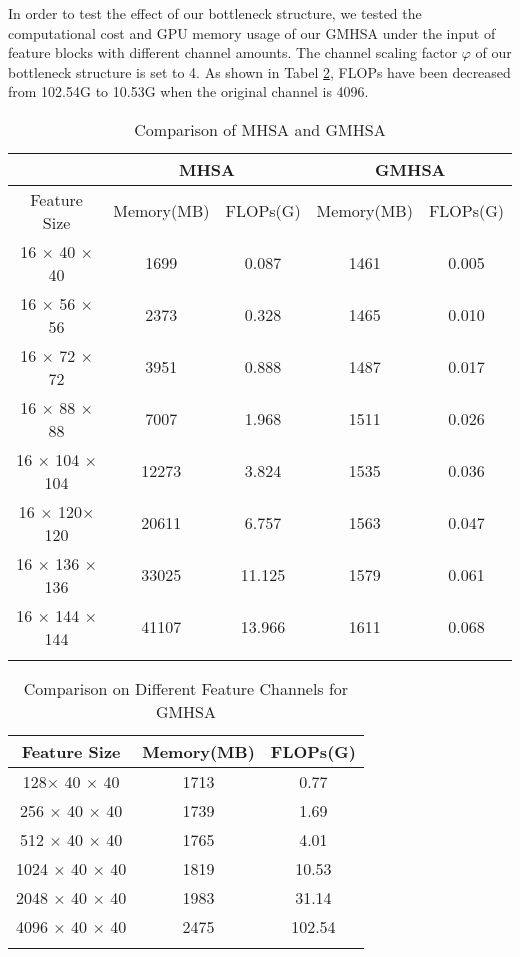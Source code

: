 \documentclass[journal]{IEEEtran}
\begin{document}
In order to test the effect of our bottleneck structure, we tested the computational cost and GPU memory usage of our GMHSA under the input of feature blocks with different channel amounts. The channel scaling factor $\varphi$ of our bottleneck structure is set to 4. As shown in Tabel \ref{tabchannel}, FLOPs have been decreased from 102.54G to 10.53G when the original channel is 4096.

\begin{table}[ht]
\centering
\renewcommand\arraystretch{1.2}
\setlength{\tabcolsep}{0.6mm}
\caption{Comparison of MHSA and GMHSA}
\begin{tabular}{c|cc|cc}
\Xhline{1pt}
& \multicolumn{2}{c|}{MHSA} & \multicolumn{2}{c}{GMHSA} \\ \hline
Feature Size & Memory(MB)  & FLOPs(G)  & Memory(MB)  & FLOPs(G)         \\ \hline
16 $\times$ 40 $\times$ 40   & 1699      & 0.087    & 1461      & 0.005     \\
16 $\times$ 56 $\times$ 56  & 2373      & 0.328     & 1465      & 0.010      \\
16 $\times$ 72 $\times$ 72   & 3951      & 0.888     & 1487      & 0.017      \\
16 $\times$ 88 $\times$ 88   & 7007      & 1.968    & 1511      & 0.026     \\
16 $\times$ 104 $\times$ 104 & 12273     & 3.824     & 1535      & 0.036      \\
16 $\times$ 120$\times$ 120   & 20611     & 6.757    & 1563      & 0.047     \\
16 $\times$ 136 $\times$ 136   & 33025     & 11.125    & 1579      & 0.061      \\
16 $\times$ 144  $\times$ 144     & 41107     & 13.966     & 1611      & 0.068     \\\Xhline{1pt}
\end{tabular}
\label{tabflops}
\end{table}


\begin{table}[ht]
\centering
\renewcommand\arraystretch{1.2}
\setlength{\tabcolsep}{2.6mm}
\caption{Comparison on Different Feature Channels for GMHSA}
\begin{tabular}{c|cc}
\Xhline{1pt}
Feature Size & Memory(MB) & FLOPs(G) \\ \hline
128$\times$ 40 $\times$ 40          & 1713       & 0.77 \\
256 $\times$ 40 $\times$ 40         & 1739       & 1.69  \\
512 $\times$ 40 $\times$ 40         & 1765       & 4.01  \\
1024 $\times$ 40 $\times$ 40        & 1819       & 10.53  \\
2048 $\times$ 40 $\times$ 40        & 1983       & 31.14  \\
4096 $\times$ 40 $\times$ 40        & 2475       & 102.54  \\\Xhline{1pt}
\end{tabular}
\label{tabchannel}
\end{table}
\end{document}

